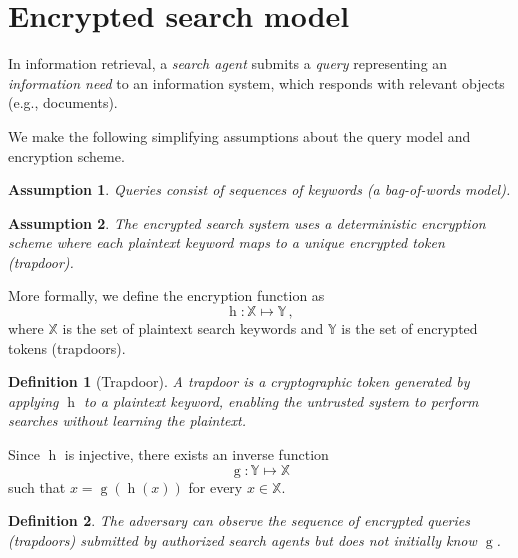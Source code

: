 \documentclass[final,11pt]{article}
\newcommand{\set}[1]{\mathbb{#1}}
\theoremstyle{plain}
\newtheorem{definition}{Definition}
\newtheorem{assumption}{Assumption}
\theoremstyle{remark}
\begin{document}
\hypertarget{encrypted-search-model}{%
\section{Encrypted search model}\label{encrypted-search-model}}

\label{sec:es_model} In information retrieval, a \emph{search agent}
submits a \emph{query} representing an \emph{information need} to an
information system, which responds with relevant objects (e.g., documents).

We make the following simplifying assumptions about the query model and
encryption scheme.

\begin{assumption}
Queries consist of sequences of keywords (a bag-of-words model).
\end{assumption}

\begin{assumption}
The encrypted search system uses a deterministic encryption scheme where
each plaintext keyword maps to a unique encrypted token (trapdoor).
\end{assumption}

More formally, we define the encryption function as
\begin{equation}
    \operatorname{h} \colon \set{X} \mapsto \set{Y}\,,
\end{equation}
where $\set{X}$ is the set of plaintext search keywords and $\set{Y}$ is
the set of encrypted tokens (trapdoors).

\begin{definition}[Trapdoor]
A trapdoor is a cryptographic token generated by applying $\operatorname{h}$
to a plaintext keyword, enabling the untrusted system to perform searches
without learning the plaintext.
\end{definition}

Since $\operatorname{h}$ is injective, there exists an inverse function
\begin{equation}
    \operatorname{g} \colon \set{Y} \mapsto \set{X}
\end{equation}
such that $x = \operatorname{g}(\operatorname{h}(x))$ for every $x \in \set{X}$.

\begin{definition}
The adversary can observe the sequence of encrypted queries (trapdoors)
submitted by authorized search agents but does not initially know
$\operatorname{g}$.
\end{definition}
\end{document}
